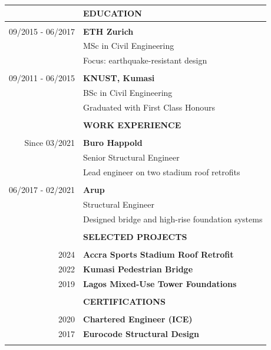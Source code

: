 \documentclass[11pt]{article}
\newcommand{\largespace}{\\[2pt]}
\newcommand{\mediumspace}{\\[-3pt]}
\newcommand{\smallspace}{\\[-5pt]}
\newcommand{\titlefont}[1]{\uppercase{\textbf{\Large{#1}}}}
\begin{document}
\begin{tcbposter}[
    poster = {columns=1, rows=1, spacing=0pt},
    boxes = {sharp corners, halign=center, valign=center, boxrule=0pt}
]
{    \begin{tabular}{>{\footnotesize}rl}

        & \titlefont{Education} \\
        \hline \mediumspace

        09/2015 - 06/2017
            & \textbf{ETH Zurich} \\
            & MSc in Civil Engineering \\
            & Focus: earthquake-resistant design \\
            & \smallspace

        09/2011 - 06/2015
            & \textbf{KNUST, Kumasi} \\
            & BSc in Civil Engineering \\
            & Graduated with First Class Honours \\
            & \largespace

        & \titlefont{Work Experience} \\
        \hline \mediumspace

        Since 03/2021
            & \textbf{Buro Happold} \\
            & Senior Structural Engineer \\
            & Lead engineer on two stadium roof retrofits \\
            & \smallspace

        06/2017 - 02/2021
            & \textbf{Arup} \\
            & Structural Engineer \\
            & Designed bridge and high-rise foundation systems \\
            & \largespace

        & \titlefont{Selected Projects} \\
        \hline \mediumspace
        2024
            & \textbf{Accra Sports Stadium Roof Retrofit} \\
        2022
            & \textbf{Kumasi Pedestrian Bridge} \\
        2019
            & \textbf{Lagos Mixed-Use Tower Foundations} \\
            & \largespace

        & \titlefont{Certifications} \\
        \hline \mediumspace

        2020
            & \textbf{Chartered Engineer (ICE)} \\
        2017
            & \textbf{Eurocode Structural Design} \\
            & \largespace


\end{tabular}}
\end{tcbposter}
\end{document}
